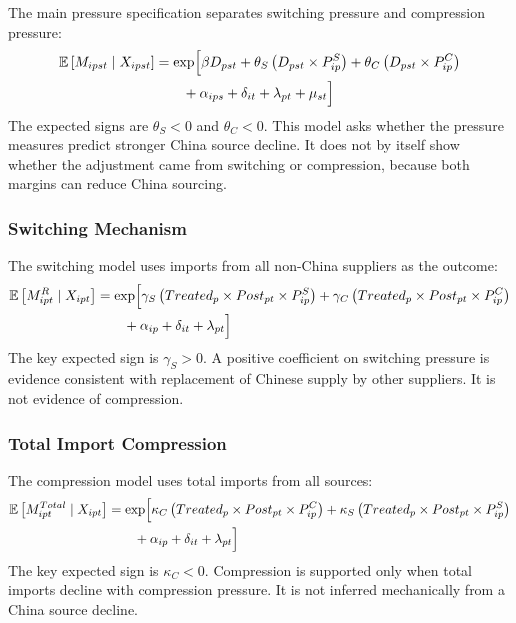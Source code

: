 \documentclass[12pt,a4paper]{article}
\numberwithin{equation}{section}
\begin{document}
The main pressure specification separates switching pressure and compression pressure:
\begin{equation}
\begin{aligned}
\mathbb{E}\left[M_{ipst}\mid X_{ipst}\right]
&=\exp\Bigl[
\beta D_{pst}
+\theta_S\left(D_{pst}\times P^S_{ip}\right)
+\theta_C\left(D_{pst}\times P^C_{ip}\right) \\
&\qquad
+\alpha_{ips}
+\delta_{it}
+\lambda_{pt}
+\mu_{st}
\Bigr]
\end{aligned}
\end{equation}
The expected signs are \(\theta_S<0\) and \(\theta_C<0\). This model asks whether the pressure measures predict stronger China source decline. It does not by itself show whether the adjustment came from switching or compression, because both margins can reduce China sourcing.

\subsubsection{Switching Mechanism}

The switching model uses imports from all non-China suppliers as the outcome:
\begin{equation}
\begin{aligned}
\mathbb{E}\left[M^R_{ipt}\mid X_{ipt}\right]
&=\exp\Bigl[
\gamma_S\left(Treated_p\times Post_{pt}\times P^S_{ip}\right)
+\gamma_C\left(Treated_p\times Post_{pt}\times P^C_{ip}\right) \\
&\qquad
+\alpha_{ip}
+\delta_{it}
+\lambda_{pt}
\Bigr]
\end{aligned}
\end{equation}
The key expected sign is \(\gamma_S>0\). A positive coefficient on switching pressure is evidence consistent with replacement of Chinese supply by other suppliers. It is not evidence of compression.

\subsubsection{Total Import Compression}

The compression model uses total imports from all sources:
\begin{equation}
\begin{aligned}
\mathbb{E}\left[M^{Total}_{ipt}\mid X_{ipt}\right]
&=\exp\Bigl[
\kappa_C\left(Treated_p\times Post_{pt}\times P^C_{ip}\right)
+\kappa_S\left(Treated_p\times Post_{pt}\times P^S_{ip}\right) \\
&\qquad
+\alpha_{ip}
+\delta_{it}
+\lambda_{pt}
\Bigr]
\end{aligned}
\end{equation}
The key expected sign is \(\kappa_C<0\). Compression is supported only when total imports decline with compression pressure. It is not inferred mechanically from a China source decline.
\end{document}
